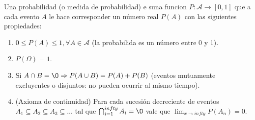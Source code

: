 \documentclass[../main.tex]{subfiles}
\begin{document}
\begin{definition}
    Una probabilidad (o medida de probabilidad) e suna funcion $P: \mathcal{A} \rightarrow [0, 1]$ que a cada evento $A$ le hace corresponder un número real $P(A)$ con las siguientes propiedades:
    \begin{enumerate}
        \item $0 \leq P(A) \leq 1, \forall A \in \mathcal{A}$ (la probabilida es un número entre 0 y 1).
        \item $P(\Omega) = 1$.
        \item Si $A \cap B = \O \Rightarrow P(A \cup B) = P(A) + P(B)$ (eventos mutuamente excluyentes o disjuntos: no pueden ocurrir al mismo tiempo).
        \item (Axioma de continuidad) Para cada sucesión decreciente de eventos $A_{1} \subseteq A_{2} \subseteq A_{3} \subseteq \dots$ tal que $\bigcap_{i=1}^{infty}A_{i} = \O$ vale que $\lim_{x\to{infty}}P(A_{n}) = 0$. 
    \end{enumerate}
\end{definition}
\end{document}
